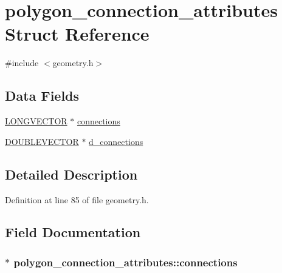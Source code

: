\hypertarget{structpolygon__connection__attributes}{\section{polygon\-\_\-connection\-\_\-attributes Struct Reference}
\label{structpolygon__connection__attributes}
}


{\ttfamily \#include $<$geometry.\-h$>$}

\subsection*{Data Fields}
\begin{DoxyCompactItemize}
\item 
\hyperlink{struct_l_o_n_g_v_e_c_t_o_r}{L\-O\-N\-G\-V\-E\-C\-T\-O\-R} $\ast$ \hyperlink{structpolygon__connection__attributes_a783577cd455f323a0a8799dd945468f2}{connections}
\item 
\hyperlink{struct_d_o_u_b_l_e_v_e_c_t_o_r}{D\-O\-U\-B\-L\-E\-V\-E\-C\-T\-O\-R} $\ast$ \hyperlink{structpolygon__connection__attributes_a488769495fb2d8b79ae938414893f5b2}{d\-\_\-connections}
\end{DoxyCompactItemize}


\subsection{Detailed Description}


Definition at line 85 of file geometry.\-h.



\subsection{Field Documentation}
\hypertarget{structpolygon__connection__attributes_a783577cd455f323a0a8799dd945468f2}{
\subsubsection[{connections}]{$\ast$ polygon\-\_\-connection\-\_\-attributes\-::connections}}\label{structpolygon__connection__attributes_a783577cd455f323a0a8799dd945468f2}


